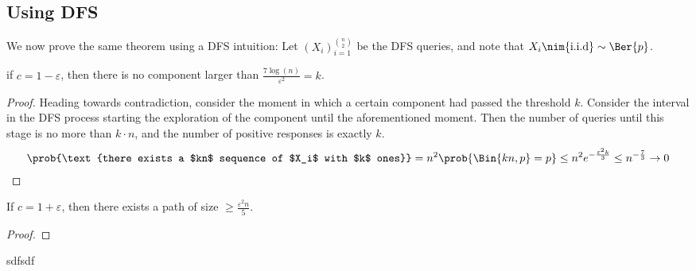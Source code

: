 \documentclass[a4paper, 11pt, oneside]{book}
\begin{document}
	\subsection{Using DFS}
	We now prove the same theorem using a DFS intuition: Let $(X_i)_{i=1}^{n\choose 2}$ be the DFS queries, and note that $X_i\nim{\text{i.i.d}}\sim \Ber{p}$.
	\begin{thm}
		if $c = 1-\varepsilon$, then there is no component larger than $\frac{7\log(n)}{\varepsilon^2} = k$. 
	
	\end{thm}
	\begin{proof}
		Heading towards contradiction, consider the moment in which a certain component had passed the threshold $k$. Consider the interval in the DFS process starting the exploration of the component until the aforementioned moment. Then the number of queries until this stage is no more than $k\cdot n$, and the number of positive responses is exactly $k$.
				\begin{align*}
			\prob{\text{there exists a $kn$ sequence of $X_i$ with $k$ ones}} = n^2\prob{\Bin{kn,p} = p}\le n^2e^{-\frac{\varepsilon^2 k}{3}}\le n^{-\frac{7}{3}} \to 0
		\end{align*}
	\end{proof}
	\begin{thm}
		If $c = 1+\varepsilon$, then there exists a path of size $\ge \frac{\varepsilon^2 n}{5}$.
	\end{thm}
	\begin{proof}
		
	\end{proof}
	\claim sdfsdf
\end{document}
